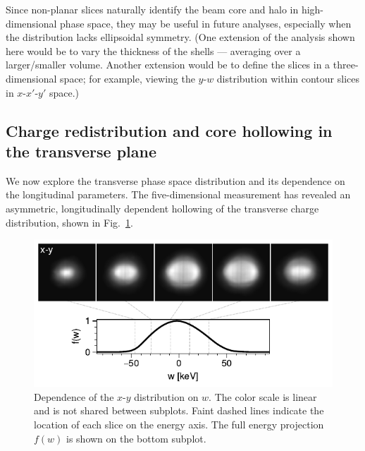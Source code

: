 \documentclass[%
 reprint,
nofootinbib,
 amsmath,amssymb,
 aps,
prstab,
]{revtex4-2}
\begin{document}
Since non-planar slices naturally identify the beam core and halo in high-dimensional phase space, they may be useful in future analyses, especially when the distribution lacks ellipsoidal symmetry. (One extension of the analysis shown here would be to vary the thickness of the shells --- averaging over a larger/smaller volume. Another extension would be to define the slices in a three-dimensional space; for example, viewing the $y$-$w$ distribution within contour slices in $x$-$x'$-$y'$ space.)



\subsection{Charge redistribution and core hollowing in the transverse plane}\label{sec:results-b}

We now explore the transverse phase space distribution and its dependence on the longitudinal parameters. The five-dimensional measurement has revealed an asymmetric, longitudinally dependent hollowing of the transverse charge distribution, shown in Fig.~\ref{fig:wslices}.
%
\begin{figure}
    \centering
    \includegraphics[width=\columnwidth]{fig_xyw.pdf}
    \caption{Dependence of the $x$-$y$ distribution on $w$. The color scale is linear and is not shared between subplots. Faint dashed lines indicate the location of each slice on the energy axis. The full energy projection $f(w)$ is shown on the bottom subplot.}
    \label{fig:wslices}
\end{figure}
%
\end{document}
